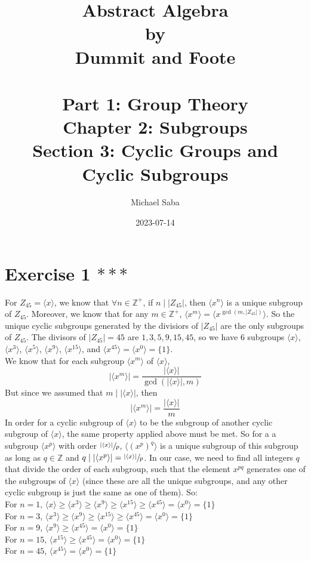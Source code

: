 \documentclass[12pt]{article}
\title{%
    \Huge Abstract Algebra \\
    \large by \\
    \Large Dummit and Foote \\~\\
    \huge Part 1: Group Theory \\
    \LARGE Chapter 2: Subgroups \\
    \Large Section 3: Cyclic Groups and Cyclic Subgroups
}
\date{2023-07-14}
\author{Michael Saba}
\newcommand{\Z}{\mathbb{Z}}
\begin{document}
    \maketitle
    \newpage


    \section*{Exercise 1 $***$}
    For $Z_{45} = \langle x \rangle$,
    we know that $\forall n \in \Z^+$,
    if $n \mid |Z_{45}|$,
    then $\langle x^n \rangle$ is a unique subgroup of $Z_{45}$.
    Moreover, we know that for any $m \in \Z^+$,
    $\langle x^m \rangle = \langle x^{\gcd(m, |Z_{45}|)} \rangle$.
    So the unique cyclic subgroups generated by the divisiors of $|Z_45|$
    are the only subgroups of $Z_{45}$.
    The divisors of $|Z_{45}| = 45$ are $1, 3, 5, 9, 15, 45$,
    so we have 6 subgroups $\langle x \rangle$, 
    $\langle x^3 \rangle$, $\langle x^5 \rangle$,
    $\langle x^9 \rangle$, $\langle x^{15} \rangle$,
    and $\langle x^{45} \rangle = \langle x^0 \rangle = \{1\}$. \\
    We know that for each subgroup
    $\langle x^m \rangle$ of $\langle x \rangle$,
    \[ |\langle x^m \rangle|
    = \dfrac{|\langle x \rangle|}{\gcd(|\langle x \rangle|, m)} \]
    But since we assumed that $m \mid |\langle x \rangle|$,
    then 
    \[ |\langle x^m \rangle|
    = \dfrac{|\langle x \rangle|}{m} \]
    In order for a cyclic subgroup of $\langle x \rangle$
    to be the subgroup of another cyclic subgroup of $\langle x \rangle$,
    the same property applied above must be met.
    So for a a subgroup $\langle x^p \rangle$ with order 
    $\sfrac{|\langle x \rangle|}{p}$,
    $\langle (x^p)^q \rangle$ is a unique subgroup of this subgroup
    as long as $q \in \Z$ and $q \mid |\langle x^p \rangle|
    = \sfrac{|\langle x \rangle|}{p}$.
    In our case, we need to find all integers $q$
    that divide the order of each subgroup,
    such that the element $x^{pq}$ generates one of the subgroups
    of $\langle x \rangle$
    (since these are all the unique subgroups, and any other cyclic
    subgroup is just the same as one of them).
    So: \\
    For $n = 1$, $\langle x \rangle
    \geqslant \langle x^3 \rangle 
    \geqslant \langle x^9 \rangle
    \geqslant \langle x^{15} \rangle
    \geqslant \langle x^{45} \rangle = \langle x^0 \rangle = \{1\}$ \\
    For $n = 3$, $\langle x^3 \rangle 
    \geqslant \langle x^9 \rangle
    \geqslant \langle x^{15} \rangle
    \geqslant \langle x^{45} \rangle = \langle x^0 \rangle = \{1\}$ \\
    For $n = 9$, $\langle x^9 \rangle
    \geqslant \langle x^{45} \rangle = \langle x^0 \rangle = \{1\}$ \\
    For $n = 15$, $\langle x^{15} \rangle
    \geqslant \langle x^{45} \rangle = \langle x^0 \rangle = \{1\}$ \\
    For $n = 45$, $\langle x^{45} \rangle = \langle x^0 \rangle = \{1\}$ \\
\end{document}
